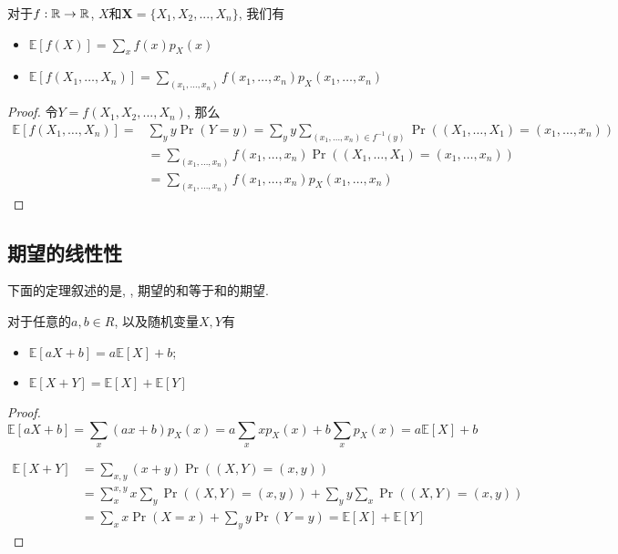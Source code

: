 \documentclass{ctexart}
\begin{document}
\begin{prop}
对于$f:\mathbb R \to \mathbb R$, $X$和$\boldsymbol X=\{ X_1,X_2,..., X_n \}$, 我们有
\begin{itemize}
    \item $\mathbb{E}[f(X)]=\sum_x f(x) p_X(x)$
    \item $\mathbb{E}\left[f\left(X_1, \ldots, X_n\right)\right]=\sum_{\left(x_1, \ldots, x_n\right)} f\left(x_1, \ldots, x_n\right) p_X\left(x_1, \ldots, x_n\right)$
\end{itemize}
    
\end{prop}

\begin{proof}
    令$Y=f(X_1, X_2, ..., X_n)$, 那么
    $$
\begin{aligned}
\mathbb{E}\left[f\left(X_1, \ldots, X_n\right)\right]= & \sum_y y \operatorname{Pr}(Y=y)=\sum_y y \sum_{\left(x_1, \ldots, x_n\right) \in f^{-1}(y)} \operatorname{Pr}\left(\left(X_1, \ldots, X_1\right)=\left(x_1, \ldots, x_n\right)\right) \\
& =\sum_{\left(x_1, \ldots, x_n\right)} f\left(x_1, \ldots, x_n\right) \operatorname{Pr}\left(\left(X_1, \ldots, X_1\right)=\left(x_1, \ldots, x_n\right)\right) \\
& =\sum_{\left(x_1, \ldots, x_n\right)} f\left(x_1, \ldots, x_n\right) p_X\left(x_1, \ldots, x_n\right)
\end{aligned}
$$
\end{proof}

\subsection{期望的线性性}

下面的定理叙述的是, , 期望的和等于和的期望. 

\begin{theorem}[期望的线性性]
    对于任意的$a,b\in R$, 以及随机变量$X, Y$有
    \begin{itemize}
        \item $\mathbb{E}[a X+b]=a \mathbb{E}[X]+b$;
        \item $\mathbb{E}[X+Y]=\mathbb{E}[X]+\mathbb{E}[Y]$
    \end{itemize}
    
\end{theorem}

\begin{proof}
    $$
\mathbb{E}[a X+b]=\sum_x(a x+b) p_X(x)=a \sum_x x p_X(x)+b \sum_x p_X(x)=a \mathbb{E}[X]+b
$$

$$
\begin{aligned}
\mathbb{E}[X+Y] & =\sum_{x, y}(x+y) \operatorname{Pr}((X, Y)=(x, y)) \\
& =\sum_x^{x, y} x \sum_y \operatorname{Pr}((X, Y)=(x, y))+\sum_y y \sum_x \operatorname{Pr}((X, Y)=(x, y)) \\
& =\sum_x x \operatorname{Pr}(X=x)+\sum_y y \operatorname{Pr}(Y=y)=\mathbb{E}[X]+\mathbb{E}[Y]
\end{aligned}
$$
\end{proof}
\end{document}
